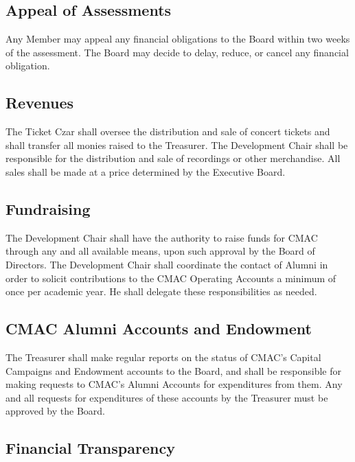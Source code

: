\documentclass{article}
\begin{document}
\subsection{Appeal of Assessments}

Any Member may appeal any financial obligations to the Board within
two weeks of the assessment. The Board may decide to delay, reduce,
or cancel any financial obligation.

\subsection{Revenues}

The Ticket Czar shall oversee the distribution and sale of concert
tickets and shall transfer all monies raised to the Treasurer. The
Development Chair shall be responsible for the distribution and sale
of recordings or other merchandise. All sales shall be made at a price
determined by the Executive Board.

\subsection{Fundraising}

The Development Chair shall have the authority to raise funds for
CMAC through any and all available means, upon such approval by the
Board of Directors. The Development Chair shall coordinate the contact
of Alumni in order to solicit contributions to the CMAC Operating
Accounts a minimum of once per academic year. He shall delegate these
responsibilities as needed.

\subsection{CMAC Alumni Accounts and Endowment}

The Treasurer shall make regular reports on the status of CMAC's Capital
Campaigns and Endowment accounts to the Board, and shall be responsible
for making requests to CMAC's Alumni Accounts for expenditures from
them. Any and all requests for expenditures of these accounts by the
Treasurer must be approved by the Board.

\subsection{Financial Transparency}
\end{document}
